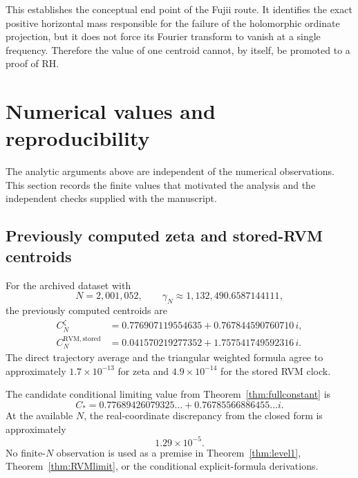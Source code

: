 \documentclass[11pt]{amsart}
\numberwithin{equation}{section}
\theoremstyle{definition}
\theoremstyle{remark}
\begin{document}
This establishes the conceptual end point of the Fujii route.  It identifies the exact positive horizontal mass responsible for the failure of the holomorphic ordinate projection, but it does not force its Fourier transform to vanish at a single frequency.  Therefore the value of one centroid cannot, by itself, be promoted to a proof of RH.

\section{Numerical values and reproducibility}\label{sec:numerics}

The analytic arguments above are independent of the numerical observations.  This section records the finite values that motivated the analysis and the independent checks supplied with the manuscript.

\subsection{Previously computed zeta and stored-RVM centroids}
For the archived dataset with
\[
N=2{,}001{,}052,
\qquad
\gamma_N\approx1{,}132{,}490.6587144111,
\]
the previously computed centroids are
\begin{align*}
C_N^{\zeta}
&=0.776907119554635+0.767844590760710\,i,\\
C_N^{\mathrm{RVM,stored}}
&=0.041570219277352+1.757541749592316\,i.
\end{align*}
The direct trajectory average and the triangular weighted formula agree to approximately $1.7\times10^{-13}$ for zeta and $4.9\times10^{-14}$ for the stored RVM clock.

The candidate conditional limiting value from Theorem~\ref{thm:fullconstant} is
\[
C_*=0.77689426079325\ldots+0.76785566886455\ldots i.
\]
At the available $N$, the real-coordinate discrepancy from the closed form is approximately
\[
1.29\times10^{-5}.
\]
No finite-$N$ observation is used as a premise in Theorem~\ref{thm:level1}, Theorem~\ref{thm:RVMlimit}, or the conditional explicit-formula derivations.
\end{document}
